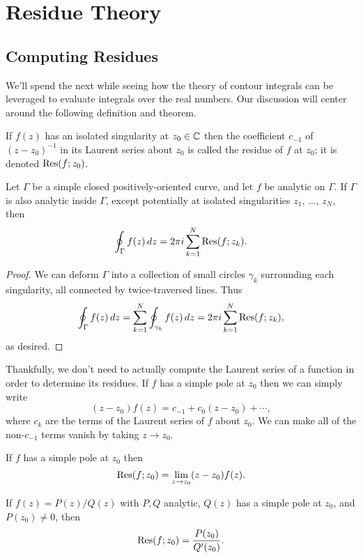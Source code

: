 \documentclass[../m136main.tex]{subfiles}
\begin{document}
\chapter{Residue Theory}
\section{Computing Residues}
We'll spend the next while seeing how the theory of contour integrals can be leveraged to evaluate integrals over the real numbers.
Our discussion will center around the following definition and theorem.

\begin{definition}[Residue]
    If $f(z)$ has an isolated singularity at $z_0 \in \mathbb{C}$ then the coefficient $c_{-1}$ of $(z - z_0)^{-1}$ in its Laurent series about $z_0$ is called the residue of $f$ at $z_0$; it is denoted $\operatorname{Res}(f; z_0)$.
\end{definition}

\begin{theorem}
    Let $\Gamma$ be a simple closed positively-oriented curve, and let $f$ be analytic on $\Gamma$.
    If $\Gamma$ is also analytic inside $\Gamma$, except potentially at isolated singularities $z_1, \, \ldots, \, z_N$, then
    \[ \oint_\Gamma f(z) \,dz = 2\pi i \sum_{k=1}^{N} \operatorname{Res}(f; z_k). \]
\end{theorem}

\begin{proof}
    We can deform $\Gamma$ into a collection of small circles $\gamma_k$ surrounding each singularity, all connected by twice-traversed lines.
    Thus
    \[ \oint_\Gamma f(z) \,dz = \sum_{k=1}^{N} \oint_{\gamma_k} f(z) \,dz = 2\pi i \sum_{k=1}^{N} \operatorname{Res}(f; z_k), \]
    as desired.
\end{proof}

Thankfully, we don't need to actually compute the Laurent series of a function in order to determine its residues.
If $f$ has a simple pole at $z_0$ then we can simply write
\[ (z - z_0) f(z) = c_{-1} + c_0(z - z_0) + \cdots, \]
where $c_k$ are the terms of the Laurent series of $f$ about $z_0$.
We can make all of the non-$c_{-1}$ terms vanish by taking $z \to z_0$.

\begin{lemma}
    If $f$ has a simple pole at $z_0$ then
    \[ \operatorname{Res}(f; z_0) = \lim_{z \to z_0} (z - z_0) f(z). \]
\end{lemma}

\begin{lemma}
    If $f(z) = P(z) / Q(z)$ with $P,Q$ analytic, $Q(z)$ has a simple pole at $z_0$, and $P(z_0) \neq 0$, then
    \[ \operatorname{Res}(f; z_0) = \frac{P(z_0)}{Q'(z_0)}. \]
\end{lemma}
\end{document}
